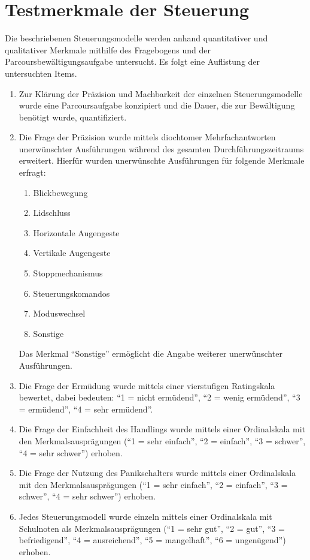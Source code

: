 \section{Testmerkmale der Steuerung}
\label{sect:testmerkmale}
Die beschriebenen Steuerungsmodelle werden anhand quantitativer und qualitativer Merkmale mithilfe des Fragebogens und der Parcoursbewältigungsaufgabe untersucht. Es folgt eine Auflistung der untersuchten Items. 
\begin{enumerate}
  \item Zur Klärung der Präzision und Machbarkeit der einzelnen Steuerungsmodelle wurde eine Parcoursaufgabe konzipiert und die Dauer, die zur Bewältigung benötigt wurde, quantifiziert.
  \item Die Frage der Präzision wurde mittels diochtomer Mehrfachantworten \bzgl unerwünschter Ausführungen während des gesamten Durchführungszeitraums erweitert. Hierfür wurden unerwünschte Ausführungen für folgende Merkmale erfragt: 
  \begin{enumerate}
  \item Blickbewegung
  \item Lidschluss
  \item Horizontale Augengeste
  \item Vertikale Augengeste
  \item Stoppmechanismus
  \item Steuerungskomandos
  \item Moduswechsel
  \item Sonstige
  \end{enumerate}
  Das Merkmal \enquote{Sonstige} ermöglicht die Angabe weiterer unerwünschter Ausführungen. 
  \item Die Frage der Ermüdung wurde mittels einer vierstufigen Ratingskala bewertet, dabei bedeuten: \enquote{1 = nicht ermüdend}, \enquote{2 = wenig ermüdend}, \enquote{3 = ermüdend}, \enquote{4 = sehr ermüdend}. 
  \item Die Frage der Einfachheit des Handlings wurde mittels einer Ordinalskala mit den Merkmalsausprägungen (\enquote{1 = sehr einfach}, \enquote{2 = einfach}, \enquote{3 = schwer}, \enquote{4 = sehr schwer}) erhoben.
 \item Die Frage der Nutzung des Panikschalters wurde mittels einer Ordinalskala mit den Merkmalsausprägungen (\enquote{1 = sehr einfach}, \enquote{2 = einfach}, \enquote{3 = schwer}, \enquote{4 = sehr schwer}) erhoben.
  \item Jedes Steuerungsmodell wurde einzeln mittels einer Ordinalskala mit Schulnoten als Merkmalsausprägungen (\enquote{1 = sehr gut}, \enquote{2 = gut}, \enquote{3 = befriedigend}, \enquote{4 = ausreichend}, \enquote{5 = mangelhaft}, \enquote{6 = ungenügend}) erhoben.
\end{enumerate}
